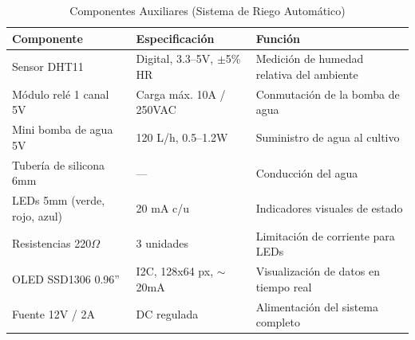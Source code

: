 \begin{table}[ht]
\caption{Componentes Auxiliares (Sistema de Riego Automático)}
\label{tab:Tabla_3_R3}
\centering
\renewcommand{\arraystretch}{1.3}
\begin{tabularx}{\columnwidth}{p{2.2cm} p{2.0cm} X}
\toprule
\textbf{Componente} & \textbf{Especificación} & \textbf{Función} \\
\midrule
Sensor DHT11
  & Digital, 3.3--5V, $\pm$5\% HR
  & Medición de humedad relativa del ambiente \\
Módulo relé 1 canal 5V
  & Carga máx. 10A / 250VAC
  & Conmutación de la bomba de agua \\
Mini bomba de agua 5V
  & 120 L/h, 0.5--1.2W
  & Suministro de agua al cultivo \\
Tubería de silicona 6mm
  & ---
  & Conducción del agua \\
LEDs 5mm (verde, rojo, azul)
  & 20 mA c/u
  & Indicadores visuales de estado \\
Resistencias 220$\Omega$
  & 3 unidades
  & Limitación de corriente para LEDs \\
OLED SSD1306 0.96''
  & I2C, 128x64 px, $\sim$20mA
  & Visualización de datos en tiempo real \\
Fuente 12V / 2A
  & DC regulada
  & Alimentación del sistema completo \\
\bottomrule
\end{tabularx}
\end{table}